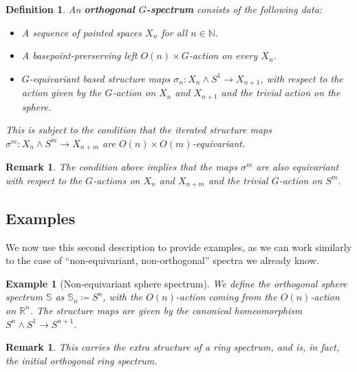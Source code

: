 \documentclass{scrartcl}
\newcommand{\textbi}[1]{\textbf{\textit{#1}}}
\newcommand{\bN}{\mathbb{N}}
\newcommand{\bR}{\mathbb{R}}
\newtheorem{defin}[subsection]{Definition}
\newtheorem{rem}[subsection]{Remark}
\newtheorem{ex}[subsection]{Example}
\begin{document}

\begin{defin}
    An \textbi{orthogonal $G$-spectrum} consists of the following data:
    \begin{itemize}
        \item A sequence of pointed spaces $X_n$ for all $n\in\bN$.
        \item A basepoint-prerserving left $O(n)\times G$-action on every $X_n$.
        \item $G$-equivariant based structure maps $\sigma_n:X_n\wedge S^1\to X_{n+1}$, with respect to the action given by the $G$-action on $X_n$ and $X_{n+1}$ and the trivial action on the sphere. 
    \end{itemize}
    This is subject to the condition that the iterated structure maps $\sigma^m:X_n\wedge S^m\to X_{n+m}$ are $O(n)\times O(m)$-equivariant.
\end{defin}

\begin{rem}
    The condition above implies that the maps $\sigma^m$ are also equivariant with respect to the $G$-actions on $X_n$ and $X_{n+m}$ and the trivial $G$-action on $S^m$.
\end{rem}

\subsection*{Examples}
We now use this second description to provide examples, as we can work similarly to the case of ``non-equivariant, non-orthogonal'' spectra we already know.

\begin{ex}[Non-equivariant sphere spectrum]
    We define the orthogonal sphere spectrum $\mathbb{S}$ as $\mathbb{S}_n\coloneqq S^n$, with the $O(n)$-action coming from the $O(n)$-action on $\bR^n$. The structure maps are given by the canonical homeomorphism $S^n\wedge S^1\to S^{n+1}$.  
\end{ex}

\begin{rem}
    This carries the extra structure of a ring spectrum, and is, in fact, the initial orthogonal ring spectrum.
\end{rem}
\end{document}
